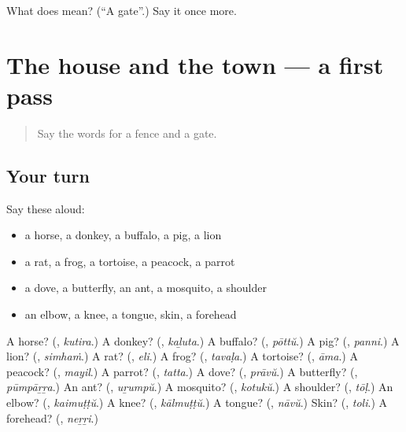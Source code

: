 \begin{tcolorbox}[breakable,colback=teal!4,colframe=teal!35!black,title={Before you move on}]
What does  mean? (\textquotedblleft{}A gate\textquotedblright{}.) Say it once more.
\end{tcolorbox}
\section[(dialogue)]{The house and the town — a first pass}

\label{lesson:ML-R159-first-pass-the-house-and-the-town}



\begin{quote}
Say the words for a fence and a gate.
\end{quote}

\subsection*{Your turn}
Say these aloud:

\begin{itemize}
\raggedright
  \item a horse, a donkey, a buffalo, a pig, a lion
  \item a rat, a frog, a tortoise, a peacock, a parrot
  \item a dove, a butterfly, an ant, a mosquito, a shoulder
  \item an elbow, a knee, a tongue, skin, a forehead
\end{itemize}

\begin{tcolorbox}[breakable,colback=teal!4,colframe=teal!35!black,title={Before you move on}]
A horse? (\textbf{}, \emph{kutira}.) A donkey? (\textbf{}, \emph{kaḻuta}.) A buffalo? (\textbf{}, \emph{pōttŭ}.) A pig? (\textbf{}, \emph{panni}.) A lion? (\textbf{}, \emph{simhaṁ}.) A rat? (\textbf{}, \emph{eli}.) A frog? (\textbf{}, \emph{tavaḷa}.) A tortoise? (\textbf{}, \emph{āma}.) A peacock? (\textbf{}, \emph{mayil}.) A parrot? (\textbf{}, \emph{tatta}.) A dove? (\textbf{}, \emph{prāvŭ}.) A butterfly? (\textbf{}, \emph{pūmpāṟṟa}.) An ant? (\textbf{}, \emph{uṟumpŭ}.) A mosquito? (\textbf{}, \emph{kotukŭ}.) A shoulder? (\textbf{}, \emph{tōḷ}.) An elbow? (\textbf{}, \emph{kaimuṭṭŭ}.) A knee? (\textbf{}, \emph{kālmuṭṭŭ}.) A tongue? (\textbf{}, \emph{nāvŭ}.) Skin? (\textbf{}, \emph{toli}.) A forehead? (\textbf{}, \emph{neṟṟi}.)
\end{tcolorbox}
